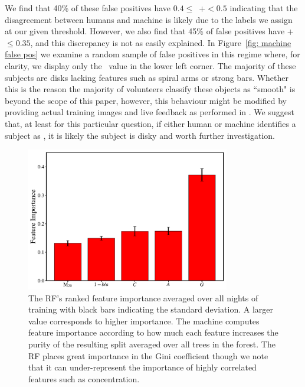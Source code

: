 We find that 40\% of these false positives have $0.4 \le$~\ffeat+\fstar$<0.5$ 
indicating that the disagreement between humans and machine is likely due to the 
labels we assign at our given threshold. However, we also find that 45\% of false
positives have \ffeat+\fstar~$\le0.35$, and this discrepancy is not as easily explained. In Figure~\ref{fig: machine false pos} we examine a random sample of false positives in this regime where, for clarity, we display only the \ffeat~value in the lower left corner. The majority of these subjects are disks lacking features such as spiral arms or strong bars. Whether this is the reason the majority of volunteers classify these objects as ``smooth" is beyond the scope of this paper, however, this behaviour might be modified by providing actual training images and live feedback as performed in \cite{Marshall2016}. We suggest that, at least for this particular question, if either human or machine identifies a subject as \feat, it is likely the subject is disky and worth further investigation.

\begin{figure}
\centering
\includegraphics[width=3.5in]{Figures/human_machine/RF_feature_importance_4paper.pdf}
\caption[Random Forest's feature importances]{The RF's ranked feature importance averaged over all nights of training with black bars indicating the standard deviation. A larger value corresponds to higher importance. The machine computes feature importance according to how much each feature increases the purity of the resulting split averaged over all trees in the forest. The RF places great importance in the Gini coefficient though we note that it can under-represent the importance of highly correlated features such as concentration.\label{fig: feature importance}}
\end{figure}

